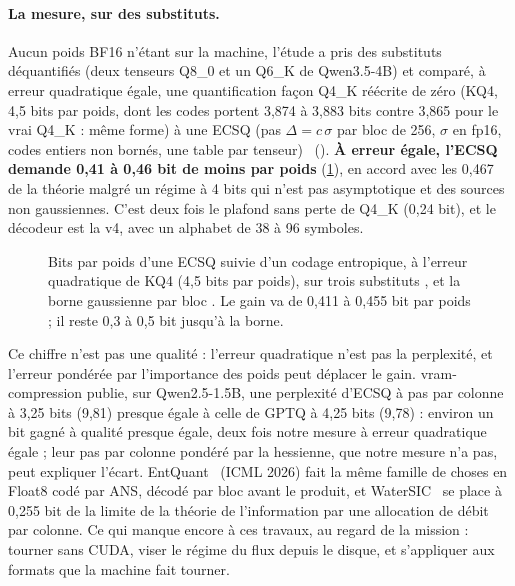 \paragraph{La mesure, sur des substituts.} Aucun poids BF16 n'étant sur la machine, l'étude a pris des substituts déquantifiés (deux tenseurs Q8\_0 et un Q6\_K de Qwen3.5-4B) et comparé, à erreur quadratique égale, une quantification façon Q4\_K réécrite de zéro (KQ4, 4,5 bits par poids, dont les codes portent 3,874 à 3,883 bits contre 3,865 pour le vrai Q4\_K : même forme) à une ECSQ (pas $\Delta = c\,\sigma$ par bloc de 256, $\sigma$ en fp16, codes entiers non bornés, une table par tenseur) \mes~(). \textbf{À erreur égale, l'ECSQ demande 0,41 à 0,46 bit de moins par poids} (\cref{fig:ent-ecsq}), en accord avec les 0,467 de la théorie malgré un régime à 4 bits qui n'est pas asymptotique et des sources non gaussiennes. C'est deux fois le plafond sans perte de Q4\_K (0,24 bit), et le décodeur est la v4, avec un alphabet de 38 à 96 symboles.

\begin{figure}[ht]
\centering
\GrapheRdProxy
\caption[À erreur égale, ce que demande une ECSQ]{Bits par poids d'une ECSQ suivie d'un codage entropique, à l'erreur quadratique de KQ4 (4,5 bits par poids), sur trois substituts \mes, et la borne gaussienne par bloc \calc. Le gain va de 0,411 à 0,455 bit par poids ; il reste 0,3 à 0,5 bit jusqu'à la borne.}
\label{fig:ent-ecsq}
\end{figure}

Ce chiffre n'est pas une qualité : l'erreur quadratique n'est pas la perplexité, et l'erreur pondérée par l'importance des poids peut déplacer le gain. vram-compression publie, sur Qwen2.5-1.5B, une perplexité d'ECSQ à pas par colonne à 3,25 bits (9,81) presque égale à celle de GPTQ à 4,25 bits (9,78) \litt : environ un bit gagné à qualité presque égale, deux fois notre mesure à erreur quadratique égale ; leur pas par colonne pondéré par la hessienne, que notre mesure n'a pas, peut expliquer l'écart. EntQuant~\cite{putzky2026entquant} (ICML 2026) fait la même famille de choses en Float8 codé par ANS, décodé par bloc avant le produit, et WaterSIC~\cite{lifar2026watersic} se place à 0,255 bit de la limite de la théorie de l'information par une allocation de débit par colonne. Ce qui manque encore à ces travaux, au regard de la mission : tourner sans CUDA, viser le régime du flux depuis le disque, et s'appliquer aux formats que la machine fait tourner.

